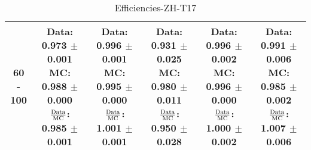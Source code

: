 \documentclass[final,letterpaper,twoside,12pt]{article}
\begin{document}
\begin{table}[htbp]
\begin{adjustwidth}{-4em}{-4em}
\begin{tabular}{|c|c|c|c|c|c|}
60 - 100 & \parbox[c]{1.1 in}{ \scriptsize  Data: 0.973 $\pm$ 0.001 \newline MC: 0.988 $\pm$ 0.000 \newline $\frac{\rm{Data}}{\rm{MC}}$: 0.985 $\pm$ 0.001} & \parbox[c]{1.1 in}{ \scriptsize  Data: 0.996 $\pm$ 0.001 \newline MC: 0.995 $\pm$ 0.000 \newline $\frac{\rm{Data}}{\rm{MC}}$: 1.001 $\pm$ 0.001} & \parbox[c]{1.1 in}{ \scriptsize  Data: 0.931 $\pm$ 0.025 \newline MC: 0.980 $\pm$ 0.011 \newline $\frac{\rm{Data}}{\rm{MC}}$: 0.950 $\pm$ 0.028} & \parbox[c]{1.1 in}{ \scriptsize  Data: 0.996 $\pm$ 0.002 \newline MC: 0.996 $\pm$ 0.000 \newline $\frac{\rm{Data}}{\rm{MC}}$: 1.000 $\pm$ 0.002} & \parbox[c]{1.1 in}{ \scriptsize  Data: 0.991 $\pm$ 0.006 \newline MC: 0.985 $\pm$ 0.002 \newline $\frac{\rm{Data}}{\rm{MC}}$: 1.007 $\pm$ 0.006}\\ \hline 
\end{tabular}
\caption {Efficiencies-ZH-T17}
\label{tab:cqdata0}
\end{adjustwidth}\end{table}
\end{document}
